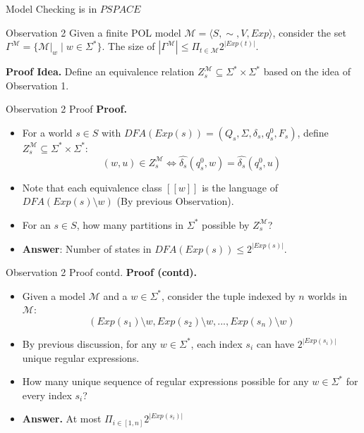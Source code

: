 \documentclass{beamer}
\newcommand{\M}{\mathcal{M}}
\begin{document}
\begin{frame}{Model Checking is in $PSPACE$}
    \begin{block}{Observation 2}
    Given a finite POL model $\M = \langle S,\sim,V,Exp \rangle$, consider the set $\Gamma^\M = \{\M|_w\mid w\in\Sigma^* \}$. The size of $|\Gamma^\M|\leq\Pi_{t \in \M} 2^{|Exp(t)|}$.
    \label{lemma:NumberOfProjectedModels}
    \end{block}\pause
    \textbf{Proof Idea.} Define an equivalence relation $Z^\M_s\subseteq \Sigma^* \times \Sigma^*$ based on the idea of Observation 1.
\end{frame}

\begin{frame}{Observation 2 Proof}
    \textbf{Proof.}\\
    \begin{itemize}
        \item<1-> For a world $s\in S$ with $DFA(Exp(s)) = (Q_s, \Sigma, \delta_s, q^0_s, F_s)$, define $Z^\M_s\subseteq\Sigma^*\times\Sigma^*$:
        $$
        (w,u)\in Z^\M_s\Leftrightarrow\widehat{\delta_s}(q^0_s, w) = \widehat{\delta_s}(q^0_s, u)
        $$
        
        \item<2-> Note that each equivalence class $[[w]]$ is the language of $DFA(Exp(s)\setminus w)$ (By previous Observation).
        \item<3-> For an $s\in S$, how many partitions in $\Sigma^*$ possible by $Z^\M_s$?
        \item<4-> \textbf{Answer}: Number of states in $DFA(Exp(s))\leq 2^{|Exp(s)|}$.
    \end{itemize}
\end{frame}


\begin{frame}{Observation 2 Proof contd.}
    \textbf{Proof (contd).}\\
    \begin{itemize}
        \item<1-> Given a model $\M$ and a $w\in\Sigma^*$, consider the tuple indexed by $n$ worlds in $\M$:
        $$
        (Exp(s_1)\setminus w, Exp(s_2)\setminus w,..., Exp(s_n)\setminus w)
        $$
        
        \item<2-> By previous discussion, for any $w\in\Sigma^*$, each index $s_i$ can have $2^{|Exp(s_i)|}$ unique regular expressions.
        
        \item<3-> How many unique sequence of regular expressions possible for any $w\in\Sigma^*$ for every index $s_i$?
        
        \item<4-> \textbf{Answer. } At most $\Pi_{i\in[1,n]}2^{|Exp(s_i)|}$
    \end{itemize}
\end{frame}
\end{document}
